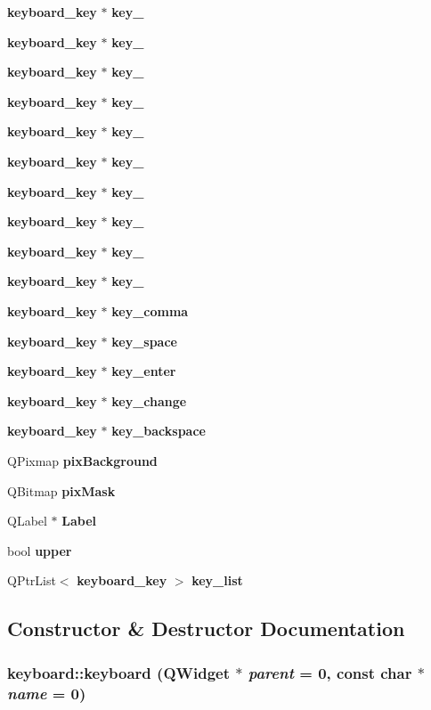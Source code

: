 \begin{CompactItemize}
\item 
{\bf keyboard\_\-key} $\ast$ {\bf key\_}
\item 
{\bf keyboard\_\-key} $\ast$ {\bf key\_}
\item 
{\bf keyboard\_\-key} $\ast$ {\bf key\_}
\item 
{\bf keyboard\_\-key} $\ast$ {\bf key\_}
\item 
{\bf keyboard\_\-key} $\ast$ {\bf key\_}
\item 
{\bf keyboard\_\-key} $\ast$ {\bf key\_}
\item 
{\bf keyboard\_\-key} $\ast$ {\bf key\_}
\item 
{\bf keyboard\_\-key} $\ast$ {\bf key\_}
\item 
{\bf keyboard\_\-key} $\ast$ {\bf key\_}
\item 
{\bf keyboard\_\-key} $\ast$ {\bf key\_}
\item 
{\bf keyboard\_\-key} $\ast$ {\bf key\_\-comma}
\item 
{\bf keyboard\_\-key} $\ast$ {\bf key\_\-space}
\item 
{\bf keyboard\_\-key} $\ast$ {\bf key\_\-enter}
\item 
{\bf keyboard\_\-key} $\ast$ {\bf key\_\-change}
\item 
{\bf keyboard\_\-key} $\ast$ {\bf key\_\-backspace}
\item 
QPixmap {\bf pix\-Background}
\item 
QBitmap {\bf pix\-Mask}
\item 
QLabel $\ast$ {\bf Label}
\item 
bool {\bf upper}
\item 
QPtr\-List$<$ {\bf keyboard\_\-key} $>$ {\bf key\_\-list}
\end{CompactItemize}


\subsection{Constructor \& Destructor Documentation}
\subsubsection{\setlength{\rightskip}{0pt plus 5cm}keyboard::keyboard ({\bf QWidget} $\ast$ {\em parent} = 0, const char $\ast$ {\em name} = 0)}\label{classkeyboard_keyboarda0}




